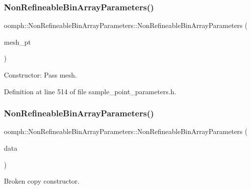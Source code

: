 \subsubsection{\texorpdfstring{Non\+Refineable\+Bin\+Array\+Parameters()}{NonRefineableBinArrayParameters()}\hspace{0.1cm}{\footnotesize\ttfamily [1/2]}}
{\footnotesize\ttfamily oomph\+::\+Non\+Refineable\+Bin\+Array\+Parameters\+::\+Non\+Refineable\+Bin\+Array\+Parameters (\begin{DoxyParamCaption}\item[{\hyperlink{classoomph_1_1Mesh}{Mesh} $\ast$}]{mesh\+\_\+pt }\end{DoxyParamCaption})\hspace{0.3cm}{\ttfamily [inline]}}



Constructor\+: Pass mesh. 



Definition at line 514 of file sample\+\_\+point\+\_\+parameters.\+h.

\mbox{\label{classoomph_1_1NonRefineableBinArrayParameters_a3f9bc402be8e192190f62927947d135f}} 
\subsubsection{\texorpdfstring{Non\+Refineable\+Bin\+Array\+Parameters()}{NonRefineableBinArrayParameters()}\hspace{0.1cm}{\footnotesize\ttfamily [2/2]}}
{\footnotesize\ttfamily oomph\+::\+Non\+Refineable\+Bin\+Array\+Parameters\+::\+Non\+Refineable\+Bin\+Array\+Parameters (\begin{DoxyParamCaption}\item[{const \hyperlink{classoomph_1_1NonRefineableBinArrayParameters}{Non\+Refineable\+Bin\+Array\+Parameters} \&}]{data }\end{DoxyParamCaption})\hspace{0.3cm}{\ttfamily [inline]}}



Broken copy constructor. 



